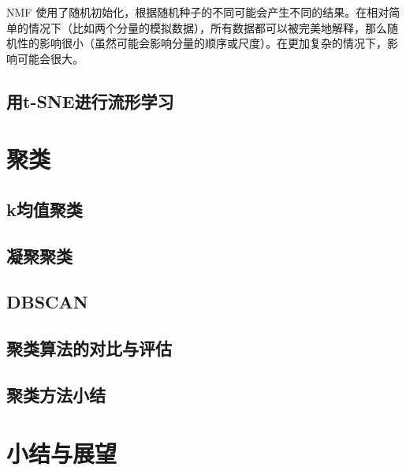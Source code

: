 NMF 使用了随机初始化，根据随机种子的不同可能会产生不同的结果。在相对简单的情况下（比如两个分量的模拟数据），所有数据都可以被完美地解释，那么随机性的影响很小（虽然可能会影响分量的顺序或尺度）。在更加复杂的情况下，影响可能会很大。
\subsection{用t-SNE进行流形学习}
\section{聚类}
\subsection{k均值聚类}
\subsection{凝聚聚类}
\subsection{DBSCAN}
\subsection{聚类算法的对比与评估}
\subsection{聚类方法小结}
\section{小结与展望}